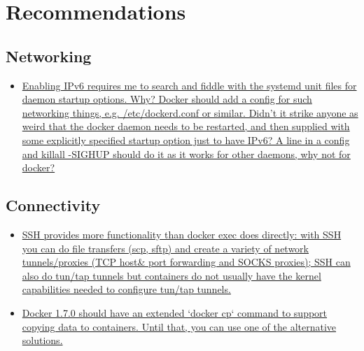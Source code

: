 
\clearpage
\chapter{Recommendations}
\label{ch:recommendations}
%

\section{Networking}

\begin{itemize}

\item \href{%
https://groups.google.com/forum/#!topic/docker-user/TgCGntvTAjs
}{%
Enabling IPv6 requires me to search and fiddle with the systemd unit files for daemon startup options. Why? Docker should add a config for such networking things, e.g. /etc/dockerd.conf or similar. Didn't it strike anyone as weird that the docker daemon needs to be restarted, and then supplied with some explicitly specified startup option just to have IPv6? A line in a config and killall -SIGHUP should do it as it works for other daemons, why not for docker?
}

\end{itemize}

\section{Connectivity}
\begin{itemize}

\item \href{%
https://developer.ibm.com/bluemix/2015/11/18/docker-workaround-lack-of-network-connectivity-between-client-and-container/
}{%
SSH provides more functionality than docker exec does directly: with SSH you can do file transfers (scp, sftp) and create a variety of network tunnels/proxies (TCP host\& port forwarding and SOCKS proxies); SSH can also do tun/tap tunnels but containers do not usually have the kernel capabilities needed to configure tun/tap tunnels.}

\item \href{%
https://medium.com/@gchudnov/copying-data-between-docker-containers-26890935da3f#.1qil6fc2j
}{%
Docker 1.7.0 should have an extended `docker cp` command to support copying data to containers. Until that, you can use one of the alternative solutions.
}
\end{itemize}


